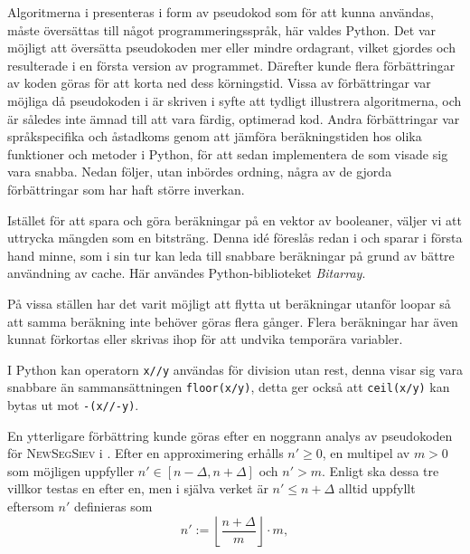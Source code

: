 
Algoritmerna i \cite{HaraldSieve} presenteras i form av pseudokod som för att kunna användas, måste översättas till något programmeringsspråk, här valdes Python.
Det var möjligt att översätta pseudokoden mer eller mindre ordagrant, vilket gjordes och resulterade i en första version av programmet.
Därefter kunde flera förbättringar av koden göras för att korta ned dess körningstid. 
Vissa av förbättringar var möjliga då pseudokoden i \cite{HaraldSieve} är skriven i syfte att tydligt illustrera algoritmerna,
och är således inte ämnad till att vara färdig, optimerad kod.
Andra förbättringar var språkspecifika och åstadkoms genom att jämföra beräkningstiden hos olika funktioner och metoder i Python, för att sedan implementera de som visade sig vara snabba. Nedan följer, utan inbördes ordning, några av de gjorda förbättringar som har haft större inverkan.
\begin{myitemize}
    \item
    Istället för att spara och göra beräkningar på en vektor av booleaner, väljer vi att uttrycka mängden som en bitsträng. 
    Denna idé föreslås redan i \cite{HaraldSieve} och sparar i första hand minne,
    som i sin tur kan leda till snabbare beräkningar på grund av bättre användning av cache.
    Här användes Python-biblioteket \textit{Bitarray}.
    \item
    På vissa ställen har det varit möjligt att flytta ut beräkningar utanför loopar så att samma beräkning inte behöver göras flera gånger. Flera beräkningar har även kunnat förkortas eller skrivas ihop för att undvika temporära variabler.
    \item
    I Python kan operatorn \texttt{x//y} användas för division utan rest, denna visar sig vara snabbare än sammansättningen \texttt{floor(x/y)}, detta ger också att \texttt{ceil(x/y)} kan bytas ut mot \texttt{-(x//-y)}.
\end{myitemize}
En ytterligare förbättring kunde göras efter en noggrann analys av pseudokoden för \textsc{NewSegSiev} i \cite[s.338]{HaraldSieve}.
Efter en approximering erhålls $n'\geq0$, en multipel av $m>0$ som möjligen uppfyller $n'\in[n-\Delta,n+\Delta]$ och $n'>m$.
Enligt \cite{HaraldSieve} ska dessa tre villkor testas en efter en,
men i själva verket är $n'\leq n+\Delta$ alltid uppfyllt eftersom $n'$ definieras som
\begin{equation} \label{helf.nprim}
    n' := \left\lfloor \frac{n+\Delta}{m} \right\rfloor\cdot m,
\end{equation}
